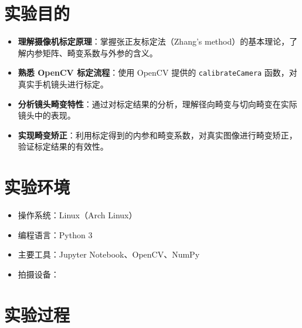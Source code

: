 \documentclass[12pt,a4paper]{ctexart}
\title{\reporttitle}
\author{\authname：\underline{李祥熙} \quad \authid：\underline{2234412799} \quad \class：\underline{计算机2301}}
\date{}
\begin{document}
\maketitle
\tableofcontents
\newpage

\section{实验目的}

\begin{itemize}
  \item \textbf{理解摄像机标定原理}：掌握张正友标定法（Zhang's method）的基本理论，了解内参矩阵、畸变系数与外参的含义。
  \item \textbf{熟悉 OpenCV 标定流程}：使用 OpenCV 提供的 \texttt{calibrateCamera} 函数，对真实手机镜头进行标定。
  \item \textbf{分析镜头畸变特性}：通过对标定结果的分析，理解径向畸变与切向畸变在实际镜头中的表现。
  \item \textbf{实现畸变矫正}：利用标定得到的内参和畸变系数，对真实图像进行畸变矫正，验证标定结果的有效性。
\end{itemize}

\section{实验环境}

\begin{itemize}
  \item 操作系统：Linux（Arch Linux）
  \item 编程语言：Python 3
  \item 主要工具：Jupyter Notebook、OpenCV、NumPy
  \item 拍摄设备：%
\end{itemize}

\section{实验过程}
\end{document}
